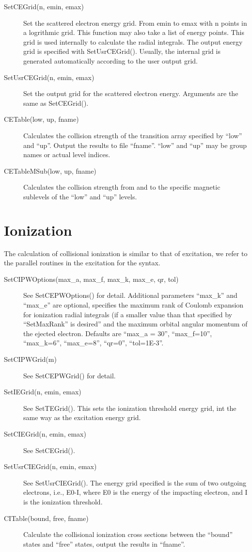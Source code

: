 \documentclass[12pt]{article}
\begin{document}
\begin{description}
\item[SetCEGrid(n, emin, emax)] 
Set the scattered electron energy grid. From emin to emax with n points in a
logrithmic grid. This function may also take a list of energy points. This
grid is used internally to calculate the radial integrals. The output energy
grid is specified with SetUsrCEGrid(). Usually, the internal grid is generated
automatically according to the user output grid. 

\item[SetUsrCEGrid(n, emin, emax)]
Set the output grid for the scattered electron energy. Arguments are the same
as SetCEGrid().

\item[CETable(low, up, fname)] Calculates the collision strength of the
transition array specified by ``low'' and ``up''. Output the results to file
``fname''. ``low'' and ``up'' may be group names or actual level indices.

\item[CETableMSub(low, up, fname)] Calculates the collision strength from and
to the specific magnetic sublevels of the ``low'' and ``up'' levels.

\end{description}

\section{Ionization}
The calculation of collisional ionization is similar to that of excitation, we
refer to the parallel routines in the excitation for the syntax.
\begin{description}
\item[SetCIPWOptions(max\_a, max\_f, max\_k, max\_e, qr, tol)] 
See SetCEPWOptions() for detail. Additional parameters ``max\_k'' and
``max\_e'' are optional, specifies the maximum rank of Coulomb expansion for
ionization radial integrals (if a smaller value than that specified by
``SetMaxRank'' is desired'' and the maximum orbital angular momentum of the
ejected electron. Defaults are ``max\_a = 30'', ``max\_f=10'', ``max\_k=6'',
``max\_e=8'', ``qr=0'', ``tol=1E-3''.

\item[SetCIPWGrid(m)]
See SetCEPWGrid() for detail.

\item[SetIEGrid(n, emin, emax)]
See SetTEGrid(). This sets the ionization threshold energy grid, int the same
way as the excitation energy grid.

\item[SetCIEGrid(n, emin, emax)]
See SetCEGrid().

\item[SetUsrCIEGrid(n, emin, emax)]
See SetUsrCIEGrid(). The energy grid specified is the sum of two outgoing
electrons, i.e., E0-I, where E0 is the energy of the impacting electron, and I
is the ionization threshold.

\item[CITable(bound, free, fname)] 
Calculate the collisional ionization cross sections between the ``bound''
states and ``free'' states, output the results in ``fname''.
\end{description}
\end{document}
